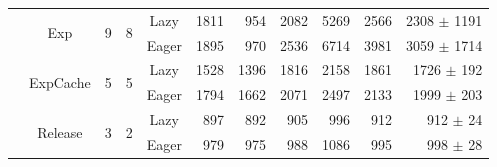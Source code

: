 \documentclass[sigplan,10pt,review,anonymous]{acmart}\settopmatter{printfolios=true,printccs=false,printacmref=false}
\begin{document}
\begin{table} [ht]
{\begin{tabular}{c|c|r|r|c|r|r|r|r|r|r}
							& \multirow{2}{*}{\small{Exp}} 		& \multirow{2}{*}{9} 		& \multirow{2}{*}{8}  		& \small{Lazy}	& 1811	& 954			& 2082	& 5269	& 2566		& 2308 $\pm$ 1191 	 \\
							&							& 					&				  	& \small{Eager}	& 1895	& 970			& 2536	& 6714	& 3981		& 3059 $\pm$ 1714 	 \\
							& \multirow{2}{*}{\small{ExpCache}} 	& \multirow{2}{*}{5} 		& \multirow{2}{*}{5}  		& \small{Lazy}	& 1528	& 1396			& 1816	& 2158	& 1861		& 1726 $\pm$ 192	 \\
							&							& 					&				  	& \small{Eager}	& 1794	& 1662			& 2071	& 2497	& 2133		& 1999 $\pm$ 203	 \\
							& \multirow{2}{*}{\small{Release}} 	& \multirow{2}{*}{3} 		& \multirow{2}{*}{2}  		& \small{Lazy}	& 897	& 892			& 905	& 996	& 912		& 912 $\pm$ 24	 \\
							&							& 					&				  	& \small{Eager}	& 979	& 975			& 988	& 1086	& 995		& 998 $\pm$ 28 	 \\

	\end{tabular} }
\label{tab:compactPause}
\vspace{-0.3cm}
\end{table}
\end{document}
